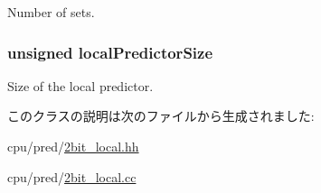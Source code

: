 \label{classLocalBP_a82806c3c6e4b9e285b11f8739a692665}
Number of sets. \hypertarget{classLocalBP_ad980634448337df2bf521bc96fd5653d}{
\subsubsection[{localPredictorSize}]{\setlength{\rightskip}{0pt plus 5cm}unsigned {\bf localPredictorSize}}}
\label{classLocalBP_ad980634448337df2bf521bc96fd5653d}
Size of the local predictor. 

このクラスの説明は次のファイルから生成されました:\begin{DoxyCompactItemize}
\item 
cpu/pred/\hyperlink{2bit__local_8hh}{2bit\_\-local.hh}\item 
cpu/pred/\hyperlink{2bit__local_8cc}{2bit\_\-local.cc}\end{DoxyCompactItemize}
